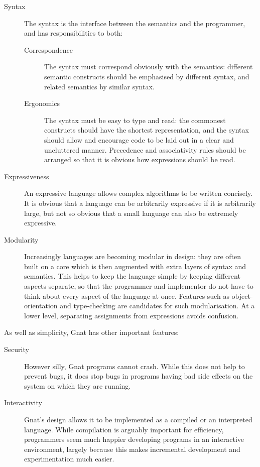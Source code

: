 \documentclass[english]{article}
\begin{document}
\begin{description}
\item[Syntax]The syntax is the interface between the semantics and the programmer, and has responsibilities to both:
\begin{description}
\item[Correspondence]The syntax must correspond obviously with the semantics: different semantic constructs should be emphasised by different syntax, and related semantics by similar syntax.
\item[Ergonomics]The syntax must be easy to type and read: the commonest constructs should have the shortest representation, and the syntax should allow and encourage code to be laid out in a clear and uncluttered manner. Precedence and associativity rules should be arranged so that it is obvious how expressions should be read.
\end{description}

\item[Expressiveness]An expressive language allows complex algorithms to be written concisely. It is obvious that a language can be arbitrarily expressive if it is arbitrarily large, but not so obvious that a small language can also be extremely expressive.

\item[Modularity]Increasingly languages are becoming modular in design: they are often built on a core which is then augmented with extra layers of syntax and semantics. This helps to keep the language simple by keeping different aspects separate, so that the programmer and implementor do not have to think about every aspect of the language at once. Features such as object-orientation and type-checking are candidates for such modularisation. At a lower level, separating assignments from expressions avoids confusion.
\end{description}


As well as simplicity, Gnat has other important features:

\begin{description}
\item[Security]However silly, Gnat programs cannot crash. While this does not help to prevent bugs, it does stop bugs in programs having bad side effects on the system on which they are running.
\item[Interactivity]Gnat's design allows it to be implemented as a compiled or an interpreted language. While compilation is arguably important for efficiency, programmers seem much happier developing programs in an interactive environment, largely because this makes incremental development and experimentation much easier.
\end{description}
\end{document}
